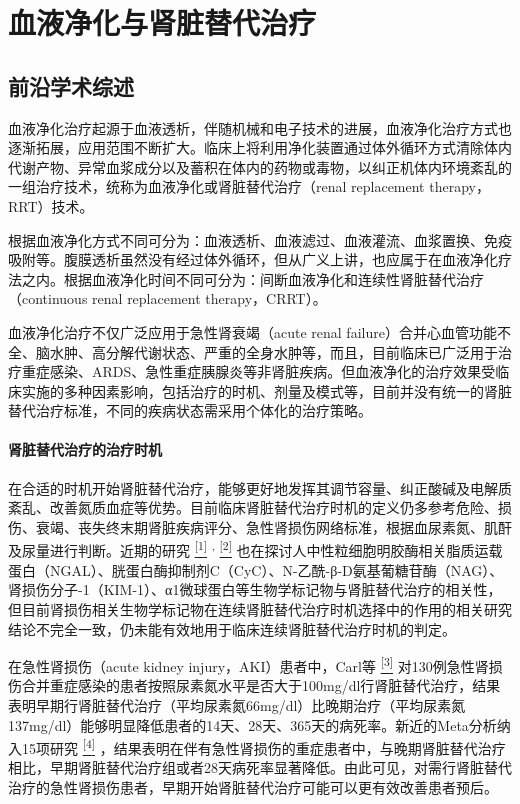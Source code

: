 \chapter{血液净化与肾脏替代治疗}

\section{前沿学术综述}

血液净化治疗起源于血液透析，伴随机械和电子技术的进展，血液净化治疗方式也逐渐拓展，应用范围不断扩大。临床上将利用净化装置通过体外循环方式清除体内代谢产物、异常血浆成分以及蓄积在体内的药物或毒物，以纠正机体内环境紊乱的一组治疗技术，统称为血液净化或肾脏替代治疗（renal
replacement therapy，RRT）技术。

根据血液净化方式不同可分为：血液透析、血液滤过、血液灌流、血浆置换、免疫吸附等。腹膜透析虽然没有经过体外循环，但从广义上讲，也应属于在血液净化疗法之内。根据血液净化时间不同可分为：间断血液净化和连续性肾脏替代治疗（continuous
renal replacement therapy，CRRT）。

血液净化治疗不仅广泛应用于急性肾衰竭（acute renal
failure）合并心血管功能不全、脑水肿、高分解代谢状态、严重的全身水肿等，而且，目前临床已广泛用于治疗重症感染、ARDS、急性重症胰腺炎等非肾脏疾病。但血液净化的治疗效果受临床实施的多种因素影响，包括治疗的时机、剂量及模式等，目前并没有统一的肾脏替代治疗标准，不同的疾病状态需采用个体化的治疗策略。

\subsubsection{肾脏替代治疗的治疗时机}

在合适的时机开始肾脏替代治疗，能够更好地发挥其调节容量、纠正酸碱及电解质紊乱、改善氮质血症等优势。目前临床肾脏替代治疗时机的定义仍多参考危险、损伤、衰竭、丧失终末期肾脏疾病评分、急性肾损伤网络标准，根据血尿素氮、肌酐及尿量进行判断。近期的研究
\protect\hyperlink{text00018.htmlux5cux23ch1-17}{\textsuperscript{{[}1{]}}}
\textsuperscript{,}
\protect\hyperlink{text00018.htmlux5cux23ch2-17}{\textsuperscript{{[}2{]}}}
也在探讨人中性粒细胞明胶酶相关脂质运载蛋白（NGAL）、胱蛋白酶抑制剂C（CyC）、N-乙酰-β-D氨基葡糖苷酶（NAG）、肾损伤分子-1（KIM-1）、α1微球蛋白等生物学标记物与肾脏替代治疗的相关性，但目前肾损伤相关生物学标记物在连续肾脏替代治疗时机选择中的作用的相关研究结论不完全一致，仍未能有效地用于临床连续肾脏替代治疗时机的判定。

在急性肾损伤（acute kidney injury，AKI）患者中，Carl等
\protect\hyperlink{text00018.htmlux5cux23ch3-17}{\textsuperscript{{[}3{]}}}
对130例急性肾损伤合并重症感染的患者按照尿素氮水平是否大于100mg/dl行肾脏替代治疗，结果表明早期行肾脏替代治疗（平均尿素氮66mg/dl）比晚期治疗（平均尿素氮137mg/dl）能够明显降低患者的14天、28天、365天的病死率。新近的Meta分析纳入15项研究
\protect\hyperlink{text00018.htmlux5cux23ch4-17}{\textsuperscript{{[}4{]}}}
，结果表明在伴有急性肾损伤的重症患者中，与晚期肾脏替代治疗相比，早期肾脏替代治疗组或者28天病死率显著降低。由此可见，对需行肾脏替代治疗的急性肾损伤患者，早期开始肾脏替代治疗可能可以更有效改善患者预后。

